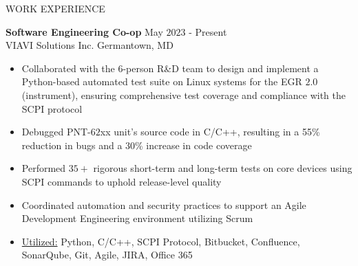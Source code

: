 \documentclass{resume} %
\begin{document}
\begin{rSection}{WORK EXPERIENCE}

{\bf Software Engineering Co-op} \hfill May $2023$ - Present\\
VIAVI Solutions Inc. \hfill Germantown, MD
\begin{itemize}[itemsep = -4pt]
    \item Collaborated with the 6-person R\&D team to design and implement a Python-based automated test suite on Linux systems for the EGR $2.0$ (instrument), ensuring comprehensive test coverage and compliance with the SCPI protocol
    \item Debugged PNT-$62$xx unit's source code in C/C++, resulting in a 55\% reduction in bugs and a 30\% increase in code coverage
    \item Performed $35+$ rigorous short-term and long-term tests on core devices using SCPI commands to uphold release-level quality
    \item Coordinated automation and security practices to support an Agile Development Engineering environment utilizing Scrum
    \item \underline{Utilized:} Python, C/C++, SCPI Protocol, Bitbucket, Confluence, SonarQube, Git, Agile, JIRA, Office 365
\end{itemize}


\end{rSection}
\end{document}

